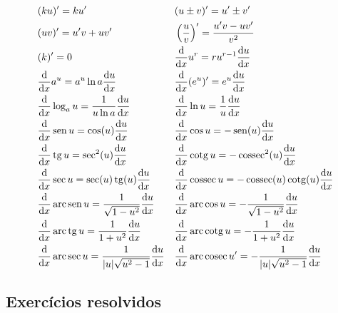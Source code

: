 \begin{small}
\begin{align}
  & (ku)' = ku' && (u\pm v)' = u' \pm v'\\
  & (uv)' = u'v + uv' && \left(\frac{u}{v}\right)' = \frac{u'v - uv'}{v^2} \\
  & (k)' = 0 && \frac{\dd}{\dd x}u^r = ru^{r-1}\frac{\dd u}{\dd x}\\
  & \frac{\dd}{\dd x}a^u = a^u\ln a\frac{\dd u}{\dd x} && \frac{\dd}{\dd x}(e^u)' = e^u\frac{\dd u}{\dd x} \\
  & \frac{\dd}{\dd x}\log_a u = \frac{1}{u\ln a}\frac{\dd u}{\dd x} && \frac{\dd}{\dd x}\ln u = \frac{1}{u}\frac{\dd u}{\dd x} \\
  & \frac{\dd}{\dd x}\sen u = \cos(u)\frac{\dd u}{\dd x} && \frac{\dd}{\dd x}\cos u = - \sen(u)\frac{\dd u}{\dd x}\\
  & \frac{\dd}{\dd x}\tg u = \sec^2(u)\frac{\dd u}{\dd x} && \frac{\dd}{\dd x}\cotg u = -\cossec^2(u)\frac{\dd u}{\dd x} \\
  & \frac{\dd}{\dd x}\sec u = \sec(u)\tg(u)\frac{\dd u}{\dd x} && \frac{\dd}{\dd x}\cossec u = -\cossec(u)\cotg(u)\frac{\dd u}{\dd x} \\
  &\frac{\dd}{\dd x}\arc\sen u = \frac{1}{\sqrt{1-u^2}}\frac{\dd u}{\dd x} && \frac{\dd}{\dd x}\arc\cos u = -\frac{1}{\sqrt{1-u^2}}\frac{\dd u}{\dd x} \\
  &\frac{\dd}{\dd x}\arc\tg u = \frac{1}{1+u^2}\frac{\dd u}{\dd x} && \frac{\dd}{\dd x}\arc\cotg u = -\frac{1}{1+u^2}\frac{\dd u}{\dd x} \\
  &\frac{\dd}{\dd x}\arc\sec u = \frac{1}{|u|\sqrt{u^2-1}}\frac{\dd u}{\dd x} && \frac{\dd}{\dd x}\arc\cosec u' = -\frac{1}{|u|\sqrt{u^2-1}}\frac{\dd u}{\dd x}
\end{align}
\end{small}

\subsection*{Exercícios resolvidos}

